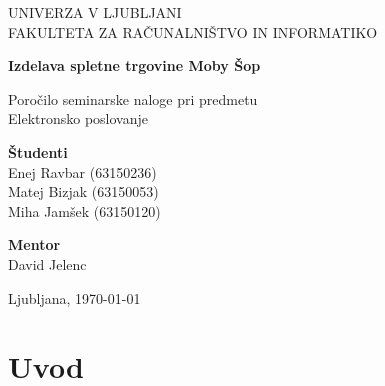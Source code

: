 \documentclass[a4paper,12pt]{report}
\newcommand{\naslov}     {Izdelava spletne trgovine Moby Šop}
\newcommand{\prviavtor}  {Enej Ravbar}
\newcommand{\prviindeks} {63150236}
\newcommand{\drugiavtor} {Matej Bizjak}
\newcommand{\drugiindeks}{63150053}
\newcommand{\tretjiavtor} {Miha Jamšek}
\newcommand{\tretjiindeks}{63150120}
\newcommand{\kraj}       {Ljubljana}
\begin{document}
\begin{titlepage}
	\begin{center}
	{UNIVERZA V LJUBLJANI\\[10pt]
	FAKULTETA ZA RAČUNALNIŠTVO IN INFORMATIKO}

	\vspace{65mm}

	{\Large\textbf{\naslov}}

	\vspace{10mm}

	{\large Poročilo seminarske naloge pri predmetu\\[10pt] Elektronsko poslovanje}

	\vfill
	\vspace{60mm}

\hspace{20mm}
\begin{minipage}[t]{70mm}
	{\bf Študenti}\\
	{\prviavtor} ({\prviindeks})\\
	{\drugiavtor} ({\drugiindeks})\\
	{\tretjiavtor} ({\tretjiindeks})
\end{minipage}
\begin{minipage}[t]{50mm}
	{\bf Mentor}\\
	David Jelenc
\end{minipage}

	\vspace{35mm}

	{	\kraj, \today}
	\end{center}
\end{titlepage}


\tableofcontents


\chapter{Uvod}
\end{document}
